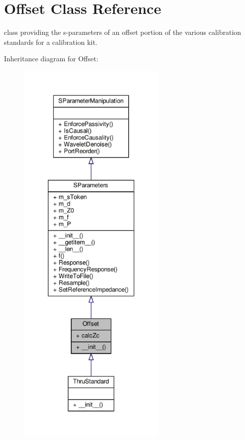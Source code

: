 \hypertarget{classSignalIntegrity_1_1Measurement_1_1CalKit_1_1Standards_1_1Offset_1_1Offset}{}\section{Offset Class Reference}
\label{classSignalIntegrity_1_1Measurement_1_1CalKit_1_1Standards_1_1Offset_1_1Offset}


class providing the s-\/parameters of an offset portion of the various calibration standards for a calibration kit.  




Inheritance diagram for Offset\+:\nopagebreak
\begin{figure}[H]
\begin{center}
\leavevmode
\includegraphics[height=550pt]{classSignalIntegrity_1_1Measurement_1_1CalKit_1_1Standards_1_1Offset_1_1Offset__inherit__graph}
\end{center}
\end{figure}


